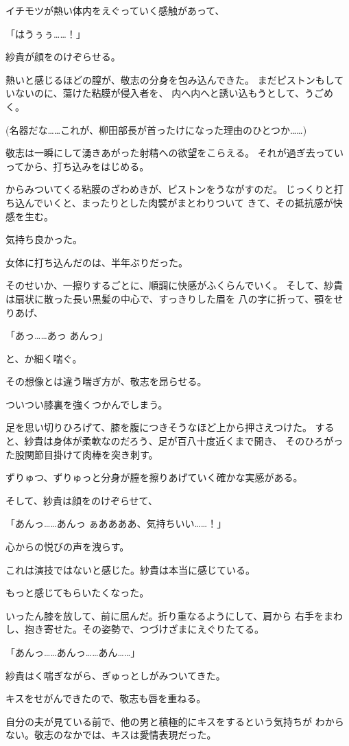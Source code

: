 ﻿\documentclass[
    book,tate,
    line_length=30zw,
    jafontsize=12pt,
    paper=b5j,
    landscape,
    ]{jlreq}
\begin{document}
イチモツが熱い体内をえぐっていく感触があって、

「はうぅぅ……！」

紗貴が顔をのけぞらせる。

熱いと感じるほどの膣が、敬志の分身を包み込んできた。
まだピストンもしていないのに、蕩けた粘膜が侵入者を、
内へ内へと誘い込もうとして、うごめく。

(名器だな……これが、柳田部長が首ったけになった理由のひとつか……)

敬志は一瞬にして湧きあがった射精への欲望をこらえる。
それが過ぎ去っていってから、打ち込みをはじめる。

からみついてくる粘膜のざわめきが、ピストンをうながすのだ。
じっくりと打ち込んでいくと、まったりとした肉襞がまとわりついて
きて、その抵抗感が快感を生む。

気持ち良かった。

女体に打ち込んだのは、半年ぶりだった。

そのせいか、一擦りするごとに、順調に快感がふくらんでいく。
そして、紗貴は扇状に散った長い黒髪の中心で、すっきりした眉を
八の字に折って、顎をせりあげ、

「あっ……あっ あんっ」

と、か細く喘ぐ。

その想像とは違う喘ぎ方が、敬志を昂らせる。

ついつい膝裏を強くつかんでしまう。

足を思い切りひろげて、膝を腹につきそうなほど上から押さえつけた。
すると、紗貴は身体が柔軟なのだろう、足が百八十度近くまで開き、
そのひろがった股関節目掛けて肉棒を突き刺す。

ずりゅつ、ずりゅっと分身が膣を擦りあげていく確かな実感がある。

そして、紗貴は顔をのけぞらせて、

「あんっ……あんっ ぁああああ、気持ちいい……！」

心からの悦びの声を洩らす。

これは演技ではないと感じた。紗貴は本当に感じている。

もっと感じてもらいたくなった。

いったん膝を放して、前に屈んだ。折り重なるようにして、肩から
右手をまわし、抱き寄せた。その姿勢で、つづけざまにえぐりたてる。

「あんっ……あんっ……あん……」

紗貴はく喘ぎながら、ぎゅっとしがみついてきた。

キスをせがんできたので、敬志も唇を重ねる。

自分の夫が見ている前で、他の男と積極的にキスをするという気持ちが
わからない。敬志のなかでは、キスは愛情表現だった。
\end{document}
